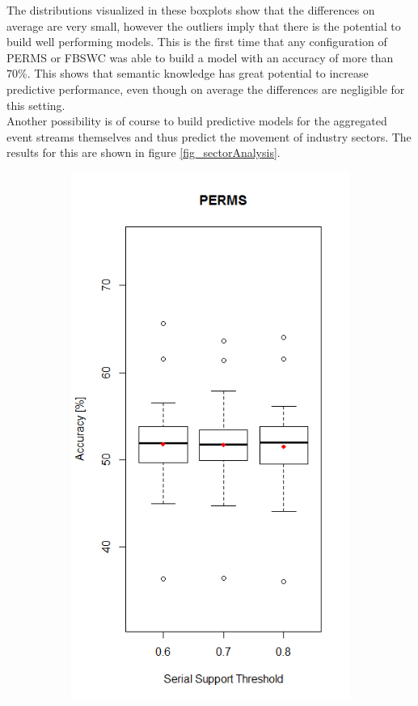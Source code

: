 The distributions visualized in these boxplots show that the differences on average are very small, however the outliers imply that there is the potential to build well performing models. This is the first time that any configuration of PERMS or FBSWC was able to build a model with an accuracy of more than $70\%$. This shows that semantic knowledge has great potential to increase predictive performance, even though on average the differences are negligible for this setting. \\
Another possibility is of course to build predictive models for the aggregated event streams themselves and thus predict the movement of industry sectors. The results for this are shown in figure \ref{fig_sectorAnalysis}.

\begin{figure}[h]
\centering
\begin{subfigure}{.5\textwidth}
  \centering
  \includegraphics[width=\linewidth]{permsSectorPrediction}

\end{subfigure}
\end{figure}

